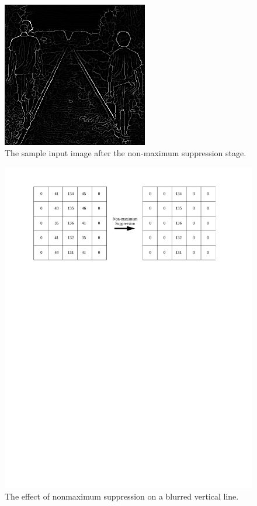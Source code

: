 \documentclass[epsfig,10pt,fullpage]{article}
\begin{document}
~\\
\begin{figure}[H]
   \begin{center}
       \includegraphics[scale = 0.85]{figures/fig_stage4_nonmax_suppression.png}
   \end{center}
   \caption{The sample input image after the non-maximum suppression stage.}
	\label{fig:sample_stage4}
\end{figure}

\begin{figure}[H]
   \begin{center}
       \includegraphics[scale = 0.8]{figures/fig_nonmaximum_suppression.pdf}
   \end{center}
   \caption{The effect of nonmaximum suppression on a blurred vertical line.}
	\label{fig:nonmaximum_suppression}
\end{figure}
\end{document}
